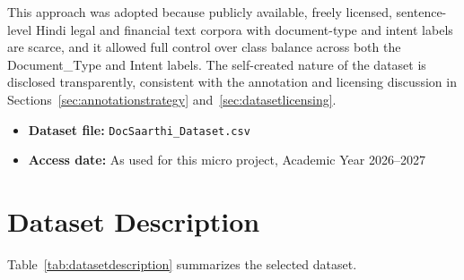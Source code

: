 This approach was adopted because publicly available, freely licensed, sentence-level Hindi legal and financial text corpora with document-type and intent labels are scarce, and it allowed full control over class balance across both the Document\_Type and Intent labels. The self-created nature of the dataset is disclosed transparently, consistent with the annotation and licensing discussion in Sections~\ref{sec:annotationstrategy} and~\ref{sec:datasetlicensing}.

\begin{itemize}
    \item \textbf{Dataset file:} \texttt{DocSaarthi\_Dataset.csv}
    \item \textbf{Access date:} As used for this micro project, Academic Year 2026--2027
\end{itemize}


\section{Dataset Description}

Table~\ref{tab:datasetdescription} summarizes the selected dataset.

\renewcommand{\arraystretch}{1.5}


